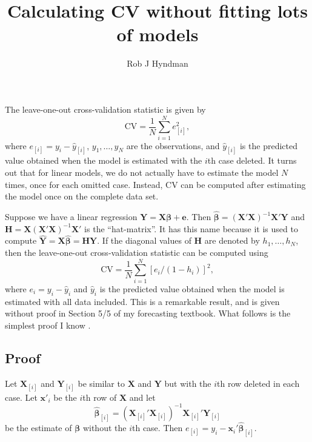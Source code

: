 \documentclass[11pt]{article}
\begin{document}
\title{Calculating CV without fitting lots of models}
\author{Rob J Hyndman}
\maketitle\thispagestyle{empty}

The leave-one-out cross-validation statistic is given by
\[\text{CV} = \frac{1}{N} \sum_{i=1}^N e_{[i]}^2,\]
where $e_{[i]} = y_i - \hat{y}_{[i]}$, $y_1,\dots,y_N$ are the observations, and  $\hat{y}_{[i]}$ is the predicted value obtained when the model is estimated with the $i$th case deleted. %
It turns out that for linear models, we do not actually have to estimate the model $N$ times, once for each omitted case. Instead, CV can be computed after estimating the model once on the complete data set.

Suppose we have a linear regression $\bm{Y} = \bm{X}\bm{\beta} + \bm{e}$. Then $\hat{\bm{\beta}} = (\bm{X}'\bm{X})^{-1}\bm{X}'\bm{Y}$ and $\bm{H} = \bm{X}(\bm{X}'\bm{X})^{-1}\bm{X}'$ is the ``hat-matrix''. It has this name because it is used to compute $\bm{\hat{Y}} = \bm{X}\hat{\bm{\beta}} = \bm{H}\bm{Y}$. If the diagonal values of $\bm{H}$ are denoted by $h_{1},\dots,h_{N}$, then the leave-one-out cross-validation statistic can be
computed using
\[ \text{CV} = \frac{1}{N}\sum_{i=1}^N [e_{i}/(1-h_{i})]^2,\]
where $e_i = y_i - \hat{y}_i $ and $\hat{y}_i$ is the predicted value obtained when the model is estimated with all data included. This is a remarkable result, and is given without proof in Section 5/5 of my forecasting textbook.
What follows is the simplest proof I know \citep[adapted from][]{Seber2003-fm}.

\subsection*{Proof}

Let $\bm{X}_{[i]}$ and $\bm{Y}_{[i]}$ be similar to $\bm{X}$ and $\bm{Y}$ but with the $i$th row deleted in each case. Let $\bm{x}'_i$ be the $i$th row of $\bm{X}$ and let
\[
\hat{\bm{\beta}}_{[i]} = (\bm{X}_{[i]}'\bm{X}_{[i]})^{-1}\bm{X}_{[i]}' \bm{Y}_{[i]}
\]
be the estimate of $\bm{\beta}$ without the $i$th case. Then $e_{[i]} = y_i - \bm{x}_i'\hat{\bm{\beta}}_{[i]}$.
\end{document}

